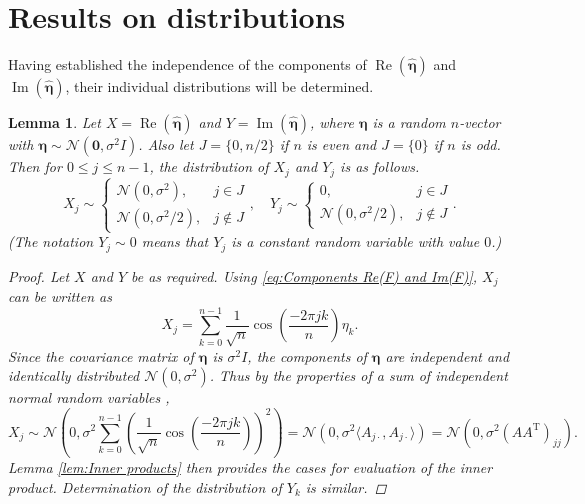\documentclass[12pt]{book}
\newcommand{\trans}{\mathrm{T}}	%
\newcommand{\noise}{\eta}	%
\newcommand{\noiseSD}{\sigma}	%
\newcommand{\noiseVec}{\bm{\noise}}	%
\renewcommand{\Re}{\operatorname{Re}}	%
\renewcommand{\Im}{\operatorname{Im}}	%
\newtheorem{lemma}{Lemma}[section]
\begin{document}
\section{Results on distributions} \label{sec:Results on distributions}

Having established the independence of the components of $\Re(\widehat{\noiseVec})$ and $\Im(\widehat{\noiseVec})$, their individual distributions will be determined. 

\begin{lemma}
\label{lem:Component distributions}
Let $X = \Re(\widehat{\noiseVec})$ and $Y = \Im(\widehat{\noiseVec})$, where $\noiseVec$ is a random $n$-vector with $\noiseVec \sim \mathcal{N}(\bm{0},\noiseSD^2 I)$. Also let $J = \{0,n/2\}$ if $n$ is even and $J = \{0\}$ if $n$ is odd. Then for $0 \leq j \leq n-1$, the distribution of $X_j$ and $Y_j$ is as follows.  
\[X_j \sim \begin{cases}
\mathcal{N}(0,\noiseSD^2), & j \in J \\
\mathcal{N}(0,\noiseSD^2/2), & j \not\in J \end{cases}, \quad Y_j \sim \begin{cases}
0, & j \in J \\
\mathcal{N}(0,\noiseSD^2/2), & j \not\in J
\end{cases}.\]
(The notation $Y_j \sim 0$ means that $Y_j$ is a constant random variable with value $0$.)
\begin{proof}
Let $X$ and $Y$ be as required. Using \eqref{eq:Components Re(F) and Im(F)}, $X_j$ can be written as
\[X_j = \sum_{k=0}^{n-1} \frac{1}{\sqrt{n}}\cos\left(\frac{-2\pi{jk}}{n}\right)\noise_k.\]
Since the covariance matrix of $\noiseVec$ is $\noiseSD^2 I$, the components of $\noiseVec$ are independent and identically distributed $\mathcal{N}(0,\noiseSD^2)$. Thus by the properties of a sum of independent normal random variables \cite[p.~184]{CasellaBerger02},
\[X_j \sim \mathcal{N}\left(0, \noiseSD^2\sum_{k=0}^{n-1} \left(\frac{1}{\sqrt{n}}\cos\left(\frac{-2\pi{jk}}{n}\right)\right)^2\right) = \mathcal{N}\left(0, \noiseSD^2 \langle A_{j\cdot},A_{j\cdot} \rangle\right) = \mathcal{N}\left(0, \noiseSD^2 (AA^\trans)_{jj}\right).\]
Lemma \ref{lem:Inner products} then provides the cases for evaluation of the inner product. Determination of the distribution of $Y_k$ is similar.
\end{proof}
\end{lemma}
\end{document}
